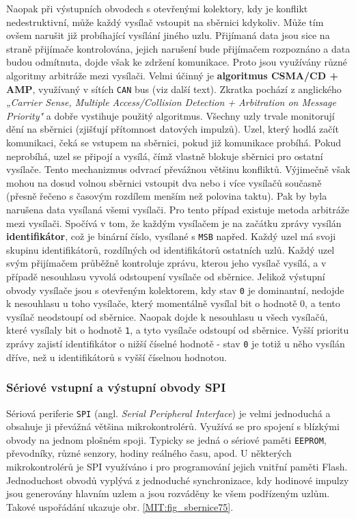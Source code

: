         Naopak při výstupních obvodech s otevřenými kolektory, kdy je konflikt nedestruktivní, může
        každý vysílač vstoupit na sběrnici kdykoliv. Může tím ovšem narušit již probíhající vysílání
        jiného uzlu. Přijímaná data jsou sice na straně přijímače kontrolována, jejich narušení bude
        přijímačem rozpoznáno a data budou odmítnuta, dojde však ke zdržení komunikace. Proto jsou
        využívány různé algoritmy arbitráže mezi vysílači. Velmi účinný je \textbf{algoritmus
        CSMA/CD + AMP}, využívaný v sítích \texttt{CAN} bus (viz další text). Zkratka pochází z
        anglického \emph{„Carrier Sense, Multiple Access/Collision Detection + Arbitration on
        Message Priority"} a dobře vystihuje použitý algoritmus. Všechny uzly trvale monitorují dění
        na sběrnici (zjišťují přítomnost datových impulzů). Uzel, který hodlá začít komunikaci, čeká
        se vstupem na sběrnici, pokud již komunikace probíhá. Pokud neprobíhá, uzel se připojí a
        vysílá, čímž vlastně blokuje sběrnici pro ostatní vysílače. Tento mechanizmus odvrací
        převážnou většinu konfliktů. Výjimečně však mohou na dosud volnou sběrnici vstoupit dva nebo
        i více vysílačů současně (přesně řečeno s časovým rozdílem menším než polovina taktu). Pak
        by byla narušena data vysílaná všemi vysílači. Pro tento případ existuje metoda arbitráže
        mezi vysílači. Spočívá v tom, že každým vysílačem je na začátku zprávy vysílán
        \textbf{identifikátor}, což je binární číslo, vysílané s \texttt{MSB} napřed. Každý uzel má
        svoji skupinu identifikátorů, rozdílných od identifikátorů ostatních uzlů. Každý uzel svým
        přijímačem průběžně kontroluje zprávu, kterou jeho vysílač vysílá, a v případě nesouhlasu
        vyvolá odstoupení vysílače od sběrnice. Jelikož výstupní obvody vysílače jsou s otevřeným
        kolektorem, kdy stav \texttt{0} je dominantní, nedojde k nesouhlasu u toho vysílače, který
        momentálně vysílal bit o hodnotě 0, a tento vysílač neodstoupí od sběrnice. Naopak dojde k
        nesouhlasu u všech vysílačů, které vysílaly bit o hodnotě \texttt{1}, a tyto vysílače
        odstoupí od sběrnice. Vyšší prioritu zprávy zajistí identifikátor o nižší číselné hodnotě -
        stav \texttt{0} je totiž u něho vysílán dříve, než u identifikátorů s vyšší číselnou
        hodnotou.
        
      \subsubsection{Sériové vstupní a výstupní obvody SPI}
        Sériová periferie \texttt{SPI} (angl. \emph{Serial Peripheral Interface}) je velmi
        jednoduchá a obsahuje ji převážná většina mikrokontrolérů. Využívá se pro spojení s blízkými
        obvody na jednom plošném spoji. Typicky se jedná o sériové paměti \texttt{EEPROM},
        převodníky, různé senzory, hodiny reálného času, apod. U některých mikrokontrolérů je SPI
        využíváno i pro programování jejich vnitřní paměti Flash. Jednoduchost obvodů vyplývá z
        jednoduché synchronizace, kdy hodinové impulzy jsou generovány hlavním uzlem a jsou
        rozváděny ke všem podřízeným uzlům. Takové uspořádání ukazuje obr. \ref{MIT:fig_sbernice75}.

